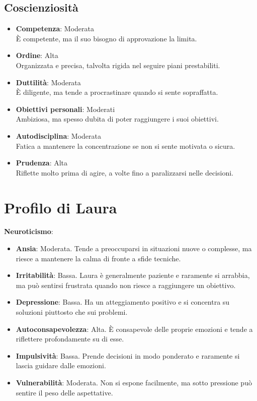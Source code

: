 \subsection*{Coscienziosità}
\begin{itemize}
    \item \textbf{Competenza}: Moderata \\
    È competente, ma il suo bisogno di approvazione la limita.
    
    \item \textbf{Ordine}: Alta \\
    Organizzata e precisa, talvolta rigida nel seguire piani prestabiliti.
    
    \item \textbf{Duttilità}: Moderata \\
    È diligente, ma tende a procrastinare quando si sente sopraffatta.
    
    \item \textbf{Obiettivi personali}: Moderati \\
    Ambiziosa, ma spesso dubita di poter raggiungere i suoi obiettivi.
    
    \item \textbf{Autodisciplina}: Moderata \\
    Fatica a mantenere la concentrazione se non si sente motivata o sicura.
    
    \item \textbf{Prudenza}: Alta \\
    Riflette molto prima di agire, a volte fino a paralizzarsi nelle decisioni.
\end{itemize}

\newpage

\section*{Profilo di Laura}

\textbf{Neuroticismo}:
\begin{itemize}
    \item \textbf{Ansia}: Moderata. Tende a preoccuparsi in situazioni nuove o complesse, ma riesce a mantenere la calma di fronte a sfide tecniche.
    \item \textbf{Irritabilità}: Bassa. Laura è generalmente paziente e raramente si arrabbia, ma può sentirsi frustrata quando non riesce a raggiungere un obiettivo.
    \item \textbf{Depressione}: Bassa. Ha un atteggiamento positivo e si concentra su soluzioni piuttosto che sui problemi.
    \item \textbf{Autoconsapevolezza}: Alta. È consapevole delle proprie emozioni e tende a riflettere profondamente su di esse.
    \item \textbf{Impulsività}: Bassa. Prende decisioni in modo ponderato e raramente si lascia guidare dalle emozioni.
    \item \textbf{Vulnerabilità}: Moderata. Non si espone facilmente, ma sotto pressione può sentire il peso delle aspettative.
\end{itemize}

